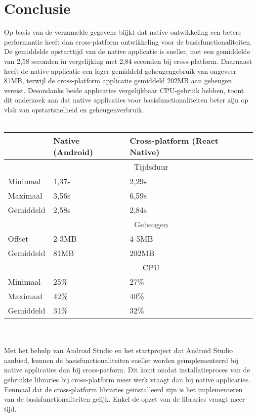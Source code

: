 \section{Conclusie}
Op basis van de verzamelde gegevens blijkt dat native ontwikkeling een betere
performantie heeft dan cross-platform ontwikkeling voor de basisfunctionaliteiten. De gemiddelde 
opstarttijd van de native applicatie is sneller, met een gemiddelde van 2,58 seconden 
in vergelijking met 2,84 seconden bij cross-platform. Daarnaast heeft de native 
applicatie een lager gemiddeld geheugengebruik van ongeveer 81MB, terwijl de cross-platform 
applicatie gemiddeld 202MB aan geheugen vereist. Desondanks beide applicaties
vergelijkbaar CPU-gebruik hebben, toont dit onderzoek aan dat native applicaties voor
basisfunctionaliteiten beter zijn op vlak van opstartsnelheid en geheugenverbruik.
\\\\
\begin{tabular}{ |p{3cm}||p{6cm}|p{6cm}| }
    \hline
     & Native (Android) & Cross-platform (React Native) \\
    \hline
     & \multicolumn{2}{|c|}{Tijdsduur} \\
    \hline
    Minimaal & 1,37s & 2,29s \\
    Maximaal & 3,56s & 6,59s \\
    Gemiddeld & 2,58s & 2,84s \\
    \hline
     & \multicolumn{2}{|c|}{Geheugen} \\ 
    \hline
    Offset & 2-3MB & 4-5MB \\
    Gemiddeld & 81MB & 202MB \\
    \hline
     & \multicolumn{2}{|c|}{CPU} \\
    \hline
    Minimaal & 25\% & 27\% \\
    Maximaal & 42\% & 40\% \\
    Gemiddeld & 31\% & 32\% \\
    \hline
\end{tabular}
\\\\
Met het behulp van Android Studio en het startproject dat Android Studio aanbied, 
kunnen de basisfunctionaliteiten sneller worden geïmplementeerd bij 
native applicaties dan bij cross-patform. Dit komt omdat installatieproces van 
de gebruikte libraries bij cross-platform meer werk vraagt dan bij native applicaties. 
Eenmaal dat de cross-platform libraries geïnstalleerd zijn is het implementeren van de 
basisfunctionaliteiten gelijk. Enkel de opzet van de libraries vraagt meer tijd.
